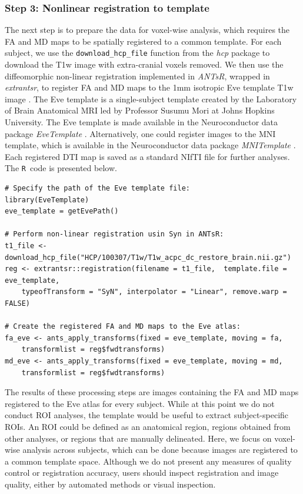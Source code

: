 \documentclass[]{elsarticle} %
\newcommand{\code}[1]{\texttt{#1}}
\newcommand{\pkg}[1]{\emph{#1}}
\newcommand{\rlang}{\texttt{R}}
\begin{document}
\subsubsection{Step 3: Nonlinear registration to template} 
The next step is to prepare the data for voxel-wise analysis, which requires the FA and MD maps to be spatially registered to a common template. For each subject, we use the \code{download\_hcp\_file} function from the \pkg{hcp} package to download the T1w image with extra-cranial voxels removed. We then use the diffeomorphic non-linear registration implemented in \pkg{ANTsR}, wrapped in \pkg{extrantsr}, to register FA and MD maps to the 1mm isotropic Eve template T1w image \citep{eve}. The Eve template is a single-subject template created by the Laboratory of Brain Anatomical MRI led by Professor Susumu Mori at Johns Hopkins University. The Eve template is made available in the Neuroconductor data package \pkg{EveTemplate} \cite{eve, MNITemplate}. Alternatively, one could register  images to the MNI template, which is available in the Neuroconductor data package \pkg{MNITemplate} \cite{mni,MNITemplate}.   Each registered DTI map is saved as a standard NIfTI file for further analyses. The \rlang~code is presented below.

\color{blue}
\begin{verbatim}
# Specify the path of the Eve template file:
library(EveTemplate)
eve_template = getEvePath()

# Perform non-linear registration usin Syn in ANTsR:
t1_file <- download_hcp_file("HCP/100307/T1w/T1w_acpc_dc_restore_brain.nii.gz")
reg <- extrantsr::registration(filename = t1_file,  template.file = eve_template, 
    typeofTransform = "SyN", interpolator = "Linear", remove.warp = FALSE)

# Create the registered FA and MD maps to the Eve atlas:
fa_eve <- ants_apply_transforms(fixed = eve_template, moving = fa, 
    transformlist = reg$fwdtransforms)
md_eve <- ants_apply_transforms(fixed = eve_template, moving = md,
    transformlist = reg$fwdtransforms)    
\end{verbatim}
\color{black}

The results of these processing steps are images containing the FA and MD maps registered to the Eve atlas for every subject. While at this point we do not conduct ROI analyses, the template would be useful to extract subject-specific ROIs. An ROI could be defined as an anatomical region, regions obtained from other analyses, or regions that are manually delineated. Here, we focus on voxel-wise analysis across subjects, which can be done because images are registered to a common template space.  Although we do not present any measures of quality control or registration accuracy, users should inspect registration and image quality, either by automated methods or visual inspection.
\end{document}
